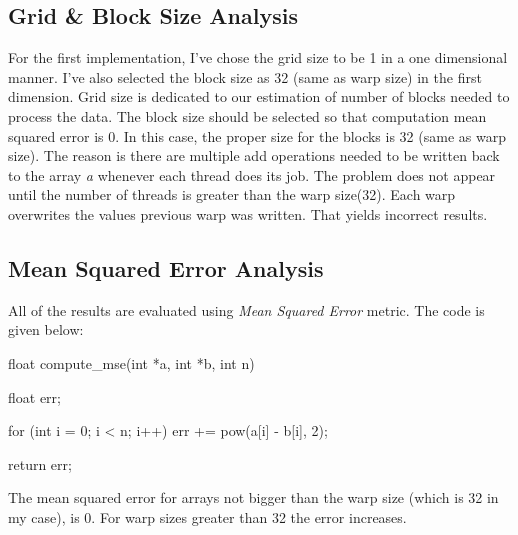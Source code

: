 \documentclass[12pt]{article}
\numberwithin{equation}{section}
\numberwithin{table}{section}
\numberwithin{figure}{section}
\begin{document}
\subsection{Grid \& Block Size Analysis}
For the first implementation, I've chose the grid size to be 1 in a one dimensional manner. I've also selected the block size as 32 (same as warp size) in the first dimension. Grid size is dedicated to our estimation of number of blocks needed to process the data. The block size should be selected so that computation mean squared error is 0. In this case, the proper size for the blocks is 32 (same as warp size). The reason is there are multiple add operations needed to be written back to the array \textit{a} whenever each thread does its job. The problem does not appear until the number of threads is greater than the warp size(32). Each warp overwrites the values previous warp was written. That yields incorrect results.
\subsection{Mean Squared Error Analysis}
All of the results are evaluated using \textit{Mean Squared Error} metric. The code is given below:
\begin{cpp}
	float compute_mse(int *a, int *b, int n) {
		float err;
		
		for (int i = 0; i < n; i++) {
			err += pow(a[i] - b[i], 2);
		}
		
		return err;
	}
\end{cpp}
The mean squared error for arrays not bigger than the warp size (which is 32 in my case), is 0. For warp sizes greater than 32 the error increases.
\end{document}
